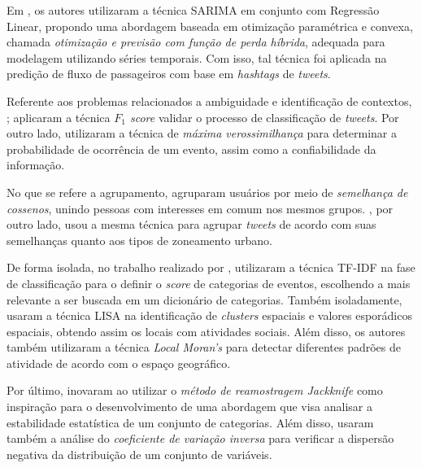 \documentclass[
	12pt,				%
	oneside,			%
	a4paper,			%
	english,			%
	brazil				%
	]{abntex2ppgsi}
\begin{document}
{{{Em \cite{Ni2016}, os autores utilizaram a técnica SARIMA em conjunto com Regressão Linear, propondo uma abordagem baseada em otimização paramétrica e convexa, chamada \textit{otimização e previsão com função de perda híbrida}, adequada para modelagem utilizando séries temporais. Com isso, tal técnica foi aplicada na predição de fluxo de passageiros com base em \textit{hashtags} de \textit{tweets}.  

Referente aos problemas relacionados a ambiguidade e identificação de contextos, \cite{Anantharam2015}; \cite{Chen2016, Gal-Tzur2014} aplicaram a técnica \textit{${F_1}$ score} validar o processo de classificação de \textit{tweets}. Por outro lado, \cite{Mukherjee2015} utilizaram a técnica de \textit{máxima verossimilhança} para determinar a probabilidade de ocorrência de um evento, assim como a confiabilidade da informação.

No que se refere a agrupamento, \cite{Yousaf2014} agruparam usuários por meio de \textit{semelhança de cossenos}, unindo pessoas com interesses em comum nos mesmos grupos. \cite{Frias-Martinez2014}, por outro lado, usou a mesma técnica para agrupar \textit{tweets} de acordo com suas semelhanças quanto aos tipos de zoneamento urbano.

De forma isolada, no trabalho realizado por \cite{Mukherjee2015}, utilizaram a técnica TF-IDF na fase de classificação para o definir o \textit{score} de categorias de eventos, escolhendo a mais relevante a ser buscada em um dicionário de categorias. Também isoladamente, \cite{Steiger2015Census} usaram a técnica LISA na identificação de \textit{clusters} espaciais e valores esporádicos espaciais, obtendo assim os locais com atividades sociais. Além disso, os autores também utilizaram a técnica \textit{Local Moran's} para detectar diferentes padrões de atividade de acordo com o espaço geográfico.

Por último, \cite{Bendler2014} inovaram ao utilizar o \textit{método de reamostragem Jackknife} como inspiração para o desenvolvimento de uma abordagem que visa analisar a estabilidade estatística de um conjunto de categorias. Além disso, usaram também a análise do \textit{coeficiente de variação inversa} para verificar a dispersão negativa da distribuição de um conjunto de variáveis. 

}}}
\end{document}
